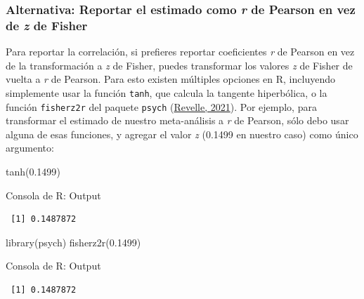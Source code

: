 \documentclass[
  bookmarksnumbered]{article}
\newenvironment{Shaded}{\begin{snugshade}}{\end{snugshade}}
\newcommand{\FloatTok}[1]{\textcolor[rgb]{0.69,0.50,0.00}{#1}}
\newcommand{\FunctionTok}[1]{\textcolor[rgb]{0.39,0.29,0.61}{#1}}
\newcommand{\NormalTok}[1]{\textcolor[rgb]{0.12,0.11,0.11}{#1}}
\begin{document}
\hypertarget{alternativa-reportar-el-estimado-como-r-de-pearson-en-vez-de-z-de-fisher}{%
\subsubsection{\texorpdfstring{Alternativa: Reportar el estimado como \emph{r} de Pearson en vez de \emph{z} de Fisher}{Alternativa: Reportar el estimado como r de Pearson en vez de z de Fisher}}\label{alternativa-reportar-el-estimado-como-r-de-pearson-en-vez-de-z-de-fisher}}

Para reportar la correlación, si prefieres reportar coeficientes \emph{r} de Pearson en vez de la transformación a \emph{z} de Fisher, puedes transformar los valores \emph{z} de Fisher de vuelta a \emph{r} de Pearson. Para esto existen múltiples opciones en R, incluyendo simplemente usar la función \texttt{tanh}, que calcula la tangente hiperbólica, o la función \texttt{fisherz2r} del paquete \texttt{psych} (\protect\hyperlink{ref-revellePsych2021}{Revelle, 2021}). Por ejemplo, para transformar el estimado de nuestro meta-análisis a \emph{r} de Pearson, sólo debo usar alguna de esas funciones, y agregar el valor \emph{z} (0.1499 en nuestro caso) como único argumento:

\begin{Shaded}
\begin{Highlighting}[]
\FunctionTok{tanh}\NormalTok{(}\FloatTok{0.1499}\NormalTok{)}
\end{Highlighting}
\end{Shaded}

\begin{ROut}{Consola de R: Output~\thetcbcounter}
                \begin{footnotesize}
                \begin{verbatim} [1] 0.1487872
 \end{verbatim}
                \end{footnotesize}
                \end{ROut}

\begin{Shaded}
\begin{Highlighting}[]
\FunctionTok{library}\NormalTok{(psych)}
\FunctionTok{fisherz2r}\NormalTok{(}\FloatTok{0.1499}\NormalTok{)}
\end{Highlighting}
\end{Shaded}

\begin{ROut}{Consola de R: Output~\thetcbcounter}
                \begin{footnotesize}
                \begin{verbatim} [1] 0.1487872
 \end{verbatim}
                \end{footnotesize}
                \end{ROut}
\end{document}
